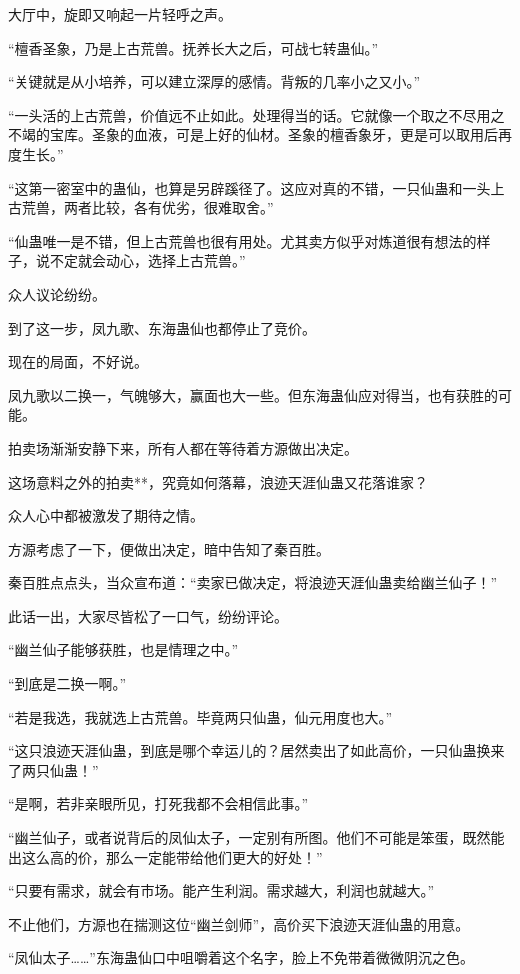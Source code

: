 \begin{this_body}
大厅中，旋即又响起一片轻呼之声。

“檀香圣象，乃是上古荒兽。抚养长大之后，可战七转蛊仙。”

“关键就是从小培养，可以建立深厚的感情。背叛的几率小之又小。”

“一头活的上古荒兽，价值远不止如此。处理得当的话。它就像一个取之不尽用之不竭的宝库。圣象的血液，可是上好的仙材。圣象的檀香象牙，更是可以取用后再度生长。”

“这第一密室中的蛊仙，也算是另辟蹊径了。这应对真的不错，一只仙蛊和一头上古荒兽，两者比较，各有优劣，很难取舍。”

“仙蛊唯一是不错，但上古荒兽也很有用处。尤其卖方似乎对炼道很有想法的样子，说不定就会动心，选择上古荒兽。”

众人议论纷纷。

到了这一步，凤九歌、东海蛊仙也都停止了竞价。

现在的局面，不好说。

凤九歌以二换一，气魄够大，赢面也大一些。但东海蛊仙应对得当，也有获胜的可能。

拍卖场渐渐安静下来，所有人都在等待着方源做出决定。

这场意料之外的拍卖**，究竟如何落幕，浪迹天涯仙蛊又花落谁家？

众人心中都被激发了期待之情。

方源考虑了一下，便做出决定，暗中告知了秦百胜。

秦百胜点点头，当众宣布道：“卖家已做决定，将浪迹天涯仙蛊卖给幽兰仙子！”

此话一出，大家尽皆松了一口气，纷纷评论。

“幽兰仙子能够获胜，也是情理之中。”

“到底是二换一啊。”

“若是我选，我就选上古荒兽。毕竟两只仙蛊，仙元用度也大。”

“这只浪迹天涯仙蛊，到底是哪个幸运儿的？居然卖出了如此高价，一只仙蛊换来了两只仙蛊！”

“是啊，若非亲眼所见，打死我都不会相信此事。”

“幽兰仙子，或者说背后的凤仙太子，一定别有所图。他们不可能是笨蛋，既然能出这么高的价，那么一定能带给他们更大的好处！”

“只要有需求，就会有市场。能产生利润。需求越大，利润也就越大。”

不止他们，方源也在揣测这位“幽兰剑师”，高价买下浪迹天涯仙蛊的用意。

“凤仙太子……”东海蛊仙口中咀嚼着这个名字，脸上不免带着微微阴沉之色。


\end{this_body}
